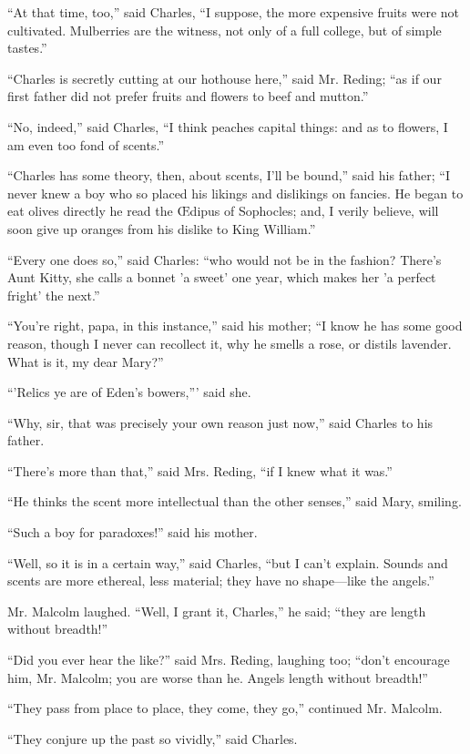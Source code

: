 ``At that time, too,'' said Charles, ``I suppose, the
more expensive fruits were not cultivated. Mulberries are the witness,
not only of a full college, but of simple tastes.''

``Charles is secretly cutting at our hothouse here,'' said
Mr. Reding; ``as if our first father did not prefer fruits and
flowers to beef and mutton.''

``No, indeed,'' said Charles, ``I think peaches capital
things: and as to flowers, I am even too fond of scents.''

``Charles has some theory, then, about scents, I'll be
bound,'' said his father; ``I never knew a boy who so placed
his likings and dislikings on fancies. He began to eat olives directly
he read the Œdipus of Sophocles; and, I verily believe, will
soon give up oranges from his dislike to King William.''

``Every one does so,'' said Charles: ``who would not be
in the fashion? There's Aunt Kitty, she calls a bonnet 'a sweet' one
year, which makes her 'a perfect fright' the next.''

``You're right, papa, in this instance,'' said his mother;
``I know he has some good reason, though I never can recollect it,
why he smells a rose, or distils lavender. What is it, my dear
Mary?''

``'Relics ye are of Eden's bowers,''' said she.

``Why, sir, that was precisely your own reason just now,''
said Charles to his father.

``There's more than that,'' said Mrs. Reding, ``if I
knew what it was.''

``He thinks the scent more intellectual than the other
senses,'' said Mary, smiling.

``Such a boy for paradoxes!'' said his mother.

``Well, so it is in a certain way,'' said Charles,
``but I can't explain. Sounds and scents are more ethereal, less
material; they have no shape—like the angels.''

Mr. Malcolm laughed. ``Well, I grant it, Charles,'' he
said; ``they are length without breadth!''

``Did you ever hear the like?'' said Mrs. Reding, laughing
too; ``don't encourage him, Mr. Malcolm; you are worse than he.
Angels length without breadth!''

``They pass from place to place, they come, they go,''
continued Mr. Malcolm.

``They conjure up the past so vividly,'' said Charles.

